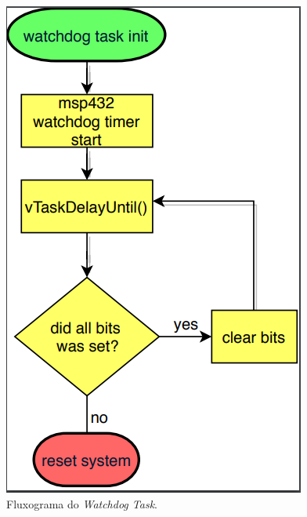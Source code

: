 \begin{apendicesenv}
\begin{figure}[!h]
	\centerfloat
	\centering
	\includegraphics[keepaspectratio=true,scale=0.35]{figuras/flowChart_wdt.PNG}
	\caption{Fluxograma do \textit{Watchdog Task}.}
	\label{flowChart_wdt}
\end{figure}


\end{apendicesenv}
